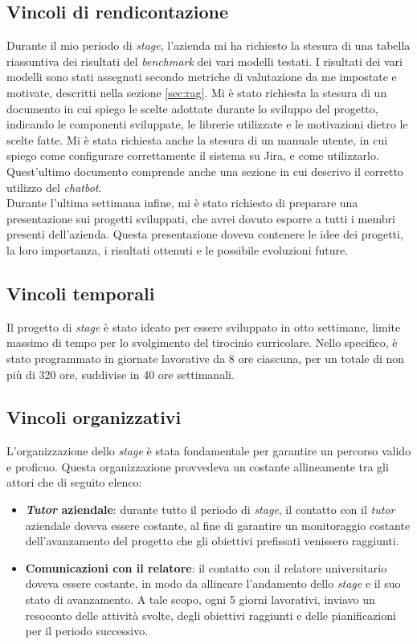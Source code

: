 \subsection{Vincoli di rendicontazione}
Durante il mio periodo di \textit{stage}, l'azienda mi ha richiesto la stesura di una tabella riassuntiva dei risultati del \textit{benchmark} dei vari modelli testati. I risultati dei vari modelli sono stati assegnati secondo metriche di valutazione da me impostate e motivate, descritti nella sezione \ref{sec:rag}.
Mi è stato richiesta la stesura di un documento in cui spiego le scelte adottate durante lo sviluppo del progetto, indicando le componenti sviluppate, le librerie utilizzate e le motivazioni dietro le scelte fatte.
Mi è stata richiesta anche la stesura di un manuale utente, in cui spiego come configurare correttamente il sistema su Jira, e come utilizzarlo. Quest'ultimo documento comprende anche una sezione in cui descrivo il corretto utilizzo del \textit{chatbot}.\\
Durante l'ultima settimana infine, mi è stato richiesto di preparare una presentazione sui progetti sviluppati, che avrei dovuto esporre a tutti i membri presenti dell'azienda. Questa presentazione doveva contenere le idee dei progetti, la loro importanza, i risultati ottenuti e le possibile evoluzioni future.
\subsection{Vincoli temporali}
Il progetto di \textit{stage} è stato ideato per essere sviluppato in otto settimane, limite massimo di tempo per lo svolgimento del tirocinio curricolare. Nello specifico, è stato programmato in giornate lavorative da 8 ore ciascuna, per un totale di non più di 320 ore, suddivise in 40 ore settimanali.

\subsection{Vincoli organizzativi}
L'organizzazione dello \textit{stage} è stata fondamentale per garantire un percorso valido e proficuo. Questa organizzazione provvedeva un costante allineamente tra gli attori che di seguito elenco:
\begin{itemize}
    \item \textbf{\textit{Tutor} aziendale}: durante tutto il periodo di \textit{stage}, il contatto con il \textit{tutor} aziendale doveva essere costante, al fine di garantire un monitoraggio costante dell'avanzamento del progetto che gli obiettivi prefissati venissero raggiunti. 
    \item \textbf{Comunicazioni con il relatore}: il contatto con il relatore universitario doveva essere costante, in modo da allineare l'andamento dello \textit{stage} e il suo stato di avanzamento. A tale scopo, ogni 5 giorni lavorativi, inviavo un resoconto delle attività svolte, degli obiettivi raggiunti e delle pianificazioni per il periodo successivo.
\end{itemize}
